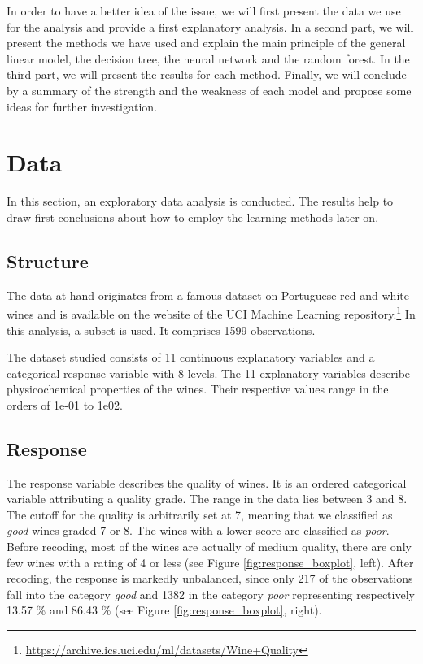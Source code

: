 \documentclass[11pt,]{article}
\let\rmarkdownfootnote\footnote%
\def\footnote{\protect\rmarkdownfootnote}
\begin{document}
In order to have a better idea of the issue, we will first present the
data we use for the analysis and provide a first explanatory analysis.
In a second part, we will present the methods we have used and explain
the main principle of the general linear model, the decision tree, the
neural network and the random forest. In the third part, we will present
the results for each method. Finally, we will conclude by a summary of
the strength and the weakness of each model and propose some ideas for
further investigation.

\hypertarget{data}{%
\section{Data}\label{data}}

In this section, an exploratory data analysis is conducted. The results
help to draw first conclusions about how to employ the learning methods
later on.

\hypertarget{structure}{%
\subsection{Structure}\label{structure}}

The data at hand originates from a famous dataset on Portuguese red and
white wines and is available on the website of the UCI Machine Learning
repository.\footnote{\url{https://archive.ics.uci.edu/ml/datasets/Wine+Quality}}
In this analysis, a subset is used. It comprises 1599 observations.

The dataset studied consists of 11 continuous explanatory variables and
a categorical response variable with 8 levels. The 11 explanatory
variables describe physicochemical properties of the wines. Their
respective values range in the orders of 1e-01 to 1e02.

\hypertarget{response}{%
\subsection{Response}\label{response}}

The response variable describes the quality of wines. It is an ordered
categorical variable attributing a quality grade. The range in the data
lies between 3 and 8. The cutoff for the quality is arbitrarily set at
7, meaning that we classified as \emph{good} wines graded 7 or 8. The
wines with a lower score are classified as \emph{poor}. Before recoding,
most of the wines are actually of medium quality, there are only few
wines with a rating of 4 or less (see Figure \ref{fig:response_boxplot},
left). After recoding, the response is markedly unbalanced, since only
217 of the observations fall into the category \emph{good} and 1382 in
the category \emph{poor} representing respectively 13.57 \% and 86.43 \%
(see Figure \ref{fig:response_boxplot}, right).
\end{document}
